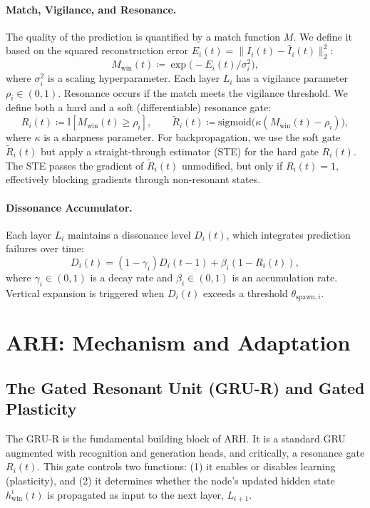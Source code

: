 \documentclass{article}
\begin{document}
\paragraph{Match, Vigilance, and Resonance.} The quality of the prediction is quantified by a match function $M$. We define it based on the squared reconstruction error $E_i(t) = \|I_i(t) - \hat{I}_i(t)\|_2^2$:
\begin{equation}
    M_{\text{win}}(t) \coloneqq \exp\big(-E_i(t) / \sigma_i^2\big),
\end{equation}
where $\sigma_i^2$ is a scaling hyperparameter. Each layer $L_i$ has a vigilance parameter $\rho_i \in (0, 1)$. Resonance occurs if the match meets the vigilance threshold. We define both a hard and a soft (differentiable) resonance gate:
\begin{equation}
    R_i(t) \coloneqq \mathbb{I}[M_{\text{win}}(t) \ge \rho_i], \qquad
    \tilde{R}_i(t) \coloneqq \text{sigmoid}\big(\kappa(M_{\text{win}}(t) - \rho_i)\big),
\end{equation}
where $\kappa$ is a sharpness parameter. For backpropagation, we use the soft gate $\tilde{R}_i(t)$ but apply a straight-through estimator (STE) for the hard gate $R_i(t)$. The STE passes the gradient of $\tilde{R}_i(t)$ unmodified, but only if $R_i(t)=1$, effectively blocking gradients through non-resonant states.

\paragraph{Dissonance Accumulator.} Each layer $L_i$ maintains a dissonance level $D_i(t)$, which integrates prediction failures over time:
\begin{equation}
    D_i(t) = (1 - \gamma_i) D_i(t-1) + \beta_i (1 - R_i(t)),
    \label{eq:dissonance}
\end{equation}
where $\gamma_i \in (0,1)$ is a decay rate and $\beta_i \in (0,1)$ is an accumulation rate. Vertical expansion is triggered when $D_i(t)$ exceeds a threshold $\theta_{\text{spawn},i}$.

\section{ARH: Mechanism and Adaptation}

\subsection{The Gated Resonant Unit (GRU-R) and Gated Plasticity}
The GRU-R is the fundamental building block of ARH. It is a standard GRU \citep{gru2014} augmented with recognition and generation heads, and critically, a resonance gate $R_i(t)$. This gate controls two functions: (1) it enables or disables learning (plasticity), and (2) it determines whether the node's updated hidden state $h_{\text{win}}^i(t)$ is propagated as input to the next layer, $L_{i+1}$.
\end{document}
